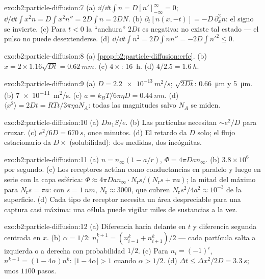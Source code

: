 \begin{solution}{exo:b2:particle-diffusion:7}
(a) $\dd/\dd t\int n = D[n']_{-\infty}^{\infty} = 0$; $\dd/\dd t\int x^2 n = D\int
x^2 n'' = 2D\int n = 2DN$. (b) $\partial_t[n(x,-t)] = -D\,\partial_x^2 n$: el
signo se invierte. (c) Para $t < 0$ la ``anchura'' $2Dt$ es negativa: no existe tal
estado --- el pulso no puede desextenderse. (d) $\dd/\dd t\int n^2 = 2D\int nn''
= -2D\int n'^2 \le 0$.
\end{solution}

\begin{solution}{exo:b2:particle-diffusion:8}
(a) \cref{prop:b2:particle-diffusion:erfc}. (b) $x = 2 \times 1.16\sqrt{Dt}
= \qty{0.62}{mm}$. (c) $4\times$: \qty{16}{h}. (d) $4/2.5 = \qty{1.6}{h}$.
\end{solution}

\begin{solution}{exo:b2:particle-diffusion:9}
(a) $D = \qty{2.2e-13}{m^2/s}$; $\sqrt{2Dt}$: \qty{0.66}{\micro m} y
\qty{5}{\micro m}. (b) \qty{7e-11}{m^2/s}. (c) $a = k_BT/6\pi\eta D =
\qty{0.44}{nm}$. (d) $\langle x^2\rangle = 2Dt = RTt/3\pi\eta a N_A$: todas las
magnitudes salvo $N_A$ se miden.
\end{solution}

\begin{solution}{exo:b2:particle-diffusion:10}
(a) $Dn_1S/e$. (b) Las partículas necesitan $\sim e^2/D$ para cruzar. (c)
$e^2/6D = \qty{670}{s}$, once minutos. (d) El retardo da $D$ solo;
el flujo estacionario da $D \times$ (solubilidad): dos medidas,
dos incógnitas.
\end{solution}

\begin{solution}{exo:b2:particle-diffusion:11}
(a) $n = n_\infty(1 - a/r)$, $\Phi = 4\pi D a n_\infty$. (b) $3.8 \times
10^6$ por segundo. (c) Los receptores actúan como conductancias en paralelo y
luego en serie con la capa esférica: $\Phi \approx 4\pi Dan_\infty
\cdot N_{\text{r}}s/(N_{\text{r}}s + \pi a)$; la mitad del máximo para
$N_{\text{r}}s = \pi a$: con $s = \qty{1}{nm}$, $N_{\text{r}} \approx
3000$, que cubren $N_{\text{r}}s^2/4a^2 \approx 10^{-3}$ de la superficie.
(d) Cada tipo de receptor necesita un área despreciable para una captura casi
máxima: una célula puede vigilar miles de sustancias a la vez.
\end{solution}

\begin{solution}{exo:b2:particle-diffusion:12}
(a) Diferencia hacia delante en $t$ y diferencia segunda centrada en $x$. (b)
$\alpha = 1/2$: $n_i^{k+1} = (n_{i-1}^k + n_{i+1}^k)/2$ --- cada partícula salta
a izquierda o a derecha con probabilidad $1/2$. (c) Para $n_i = (-1)^i$, $n^{k+1} =
(1 - 4\alpha)n^k$: $|1 - 4\alpha| > 1$ cuando $\alpha > 1/2$. (d) $\Delta t \le
\Delta x^2/2D = \qty{3.3}{s}$; unos $1100$ pasos.
\end{solution}

